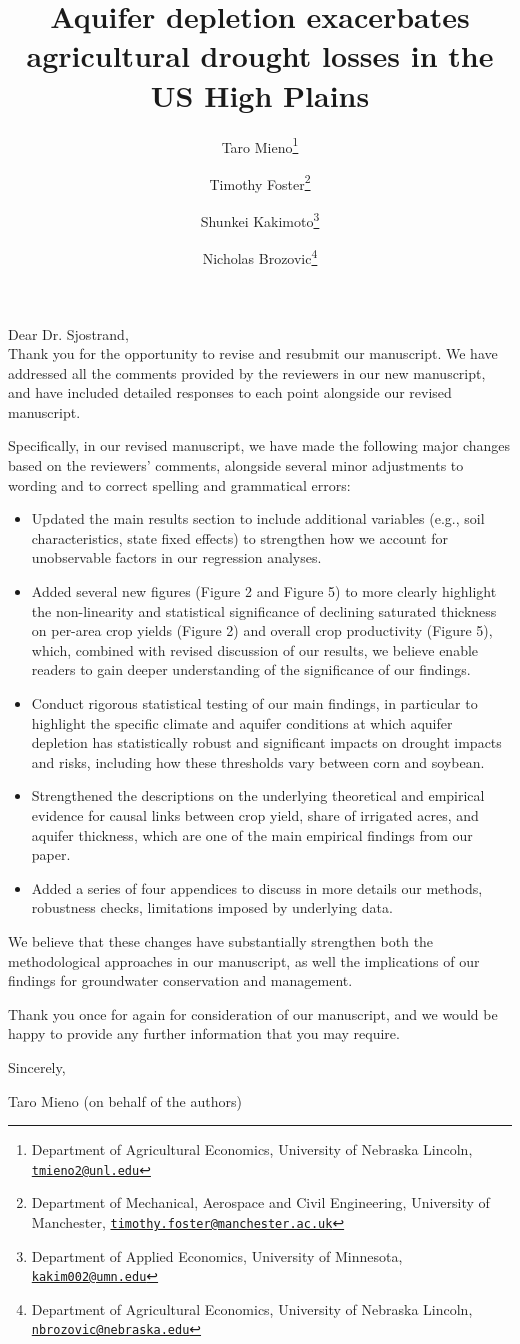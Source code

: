 \documentclass[
]{article}
\title{Aquifer depletion exacerbates agricultural drought losses in the US High Plains}
\author{Taro Mieno\footnote{Department of Agricultural Economics, University of Nebraska Lincoln, \href{mailto:tmieno2@unl.edu}{\nolinkurl{tmieno2@unl.edu}}} \and Timothy Foster\footnote{Department of Mechanical, Aerospace and Civil Engineering, University of Manchester, \href{mailto:timothy.foster@manchester.ac.uk}{\nolinkurl{timothy.foster@manchester.ac.uk}}} \and Shunkei Kakimoto\footnote{Department of Applied Economics, University of Minnesota, \href{mailto:kakim002@umn.edu}{\nolinkurl{kakim002@umn.edu}}} \and Nicholas Brozovic\footnote{Department of Agricultural Economics, University of Nebraska Lincoln, \href{mailto:nbrozovic@nebraska.edu}{\nolinkurl{nbrozovic@nebraska.edu}}}}
\date{}
\begin{document}
\maketitle

Dear Dr. Sjostrand,\\

Thank you for the opportunity to revise and resubmit our manuscript. We have addressed all the comments provided by the reviewers in our new manuscript, and have included detailed responses to each point alongside our revised manuscript. 

Specifically, in our revised manuscript, we have made the following major changes based on the reviewers' comments, alongside several minor adjustments to wording and to correct spelling and grammatical errors:

\begin{itemize}
    \item Updated the main results section to include additional variables (e.g., soil characteristics, state fixed effects) to strengthen how we account for unobservable factors in our regression analyses.
    \item Added several new figures (Figure 2 and Figure 5) to more clearly highlight the non-linearity and statistical significance of declining saturated thickness on per-area crop yields (Figure 2) and overall crop productivity (Figure 5), which, combined with revised discussion of our results, we believe enable readers to gain deeper understanding of the significance of our findings. 
    \item Conduct rigorous statistical testing of our main findings, in particular to highlight the specific climate and aquifer conditions at which aquifer depletion has statistically robust and significant impacts on drought impacts and risks, including how these thresholds vary between corn and soybean.
    \item Strengthened the descriptions on the underlying theoretical and empirical evidence for causal links between crop yield, share of irrigated acres, and aquifer thickness, which are one of the main empirical findings from our paper.
    \item Added a series of four appendices to discuss in more details our methods, robustness checks, limitations imposed by underlying data. 
\end{itemize}

We believe that these changes have substantially strengthen both the methodological approaches in our manuscript, as well the implications of our findings for groundwater conservation and management. 

Thank you once for again for consideration of our manuscript, and we would be happy to provide any further information that you may require.

Sincerely,

Taro Mieno (on behalf of the authors)
\end{document}
